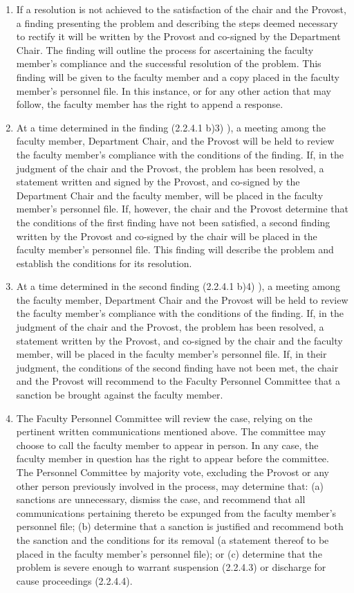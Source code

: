 \documentclass[letterpaper, 11pt]{article}
\begin{document}
\begin{enumerate}[label=\alph*)]
{\begin{enumerate}[label=\arabic*)]
							\item{If a resolution is not achieved to the satisfaction of the chair and the Provost, a finding presenting the problem and describing the steps deemed necessary to rectify it will be written by the Provost and co-signed by the Department Chair. The finding will outline the process for ascertaining the faculty member's compliance and the successful resolution of the problem.  This finding will be given to the faculty member and a copy placed in the faculty member's personnel file. In this instance, or for any other action that may follow, the faculty member has the right to append a response.}
							\item{At a time determined in the finding (2.2.4.1 b)3) ), a meeting among the faculty member, Department Chair, and the Provost will be held to review the faculty member's compliance with the conditions of the finding.  If, in the judgment of the chair and the Provost, the problem has been resolved, a statement written and signed by the Provost, and co-signed by the Department Chair and the faculty member, will be placed in the faculty member's personnel file.  If, however, the chair and the Provost determine that the conditions of the first finding have not been satisfied, a second finding written by the Provost and co-signed by the chair will be placed in the faculty member's personnel file.  This finding will describe the problem and establish the conditions for its resolution.}
							\item{At a time determined in the second finding (2.2.4.1 b)4) ), a meeting among the faculty member, Department Chair and the Provost will be held to review the faculty member's compliance with the conditions of the finding.  If, in the judgment of the chair and the Provost, the problem has been resolved, a statement written by the Provost, and co-signed by the chair and the faculty member, will be placed in the faculty member's personnel file.  If, in their judgment, the conditions of the second finding have not been met, the chair and the Provost will recommend to the Faculty Personnel Committee that a sanction be brought against the faculty member.}
							\item{The Faculty Personnel Committee will review the case, relying on the pertinent written communications mentioned above.  The committee may choose to call the faculty member to appear in person.  In any case, the faculty member in question has the right to appear before the committee.  The Personnel Committee by majority vote, excluding the Provost or any other person previously involved in the process, may determine that: (a) sanctions are unnecessary, dismiss the case, and recommend that all communications pertaining thereto be expunged from the faculty member's personnel file; (b) determine that a sanction is justified and recommend both the sanction and the conditions for its removal (a statement thereof to be placed in the faculty member's personnel file); or (c) determine that the problem is severe enough to warrant suspension (2.2.4.3) or discharge for cause proceedings (2.2.4.4).}

\end{enumerate}}
\end{enumerate}
\end{document}
